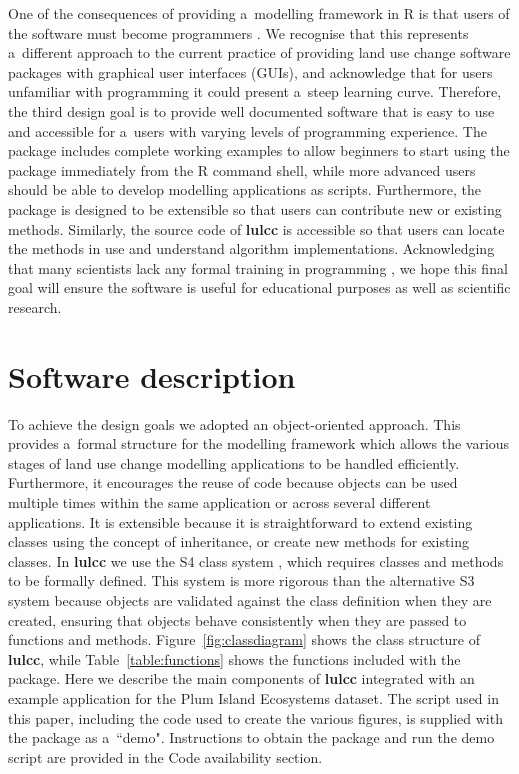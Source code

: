 \documentclass[gmdd, online, hvmath]{copernicus}
\begin{document}
One of the consequences of providing a~modelling framework in R is that users of the software must become programmers \citep{chambers2000}. We recognise that this represents a~different approach to the current practice of providing land use change software packages with graphical user interfaces (GUIs), and acknowledge that for users unfamiliar with programming it could present a~steep learning curve. Therefore, the third design goal is to provide well documented software that is easy to use and accessible for a~users with varying levels of programming experience. The package includes complete working examples to allow beginners to start using the package immediately from the R command shell, while more advanced users should be able to develop modelling applications as scripts. Furthermore, the package is designed to be extensible so that users can contribute new or existing methods. Similarly, the source code of \textbf{lulcc} is accessible so that users can locate the methods in use and understand algorithm implementations. Acknowledging that many scientists lack any formal training in programming \citep{joppa2013,wilson2014}, we hope this final goal will ensure the software is useful for educational purposes as well as scientific research. \\

\section{Software description}

To achieve the design goals we adopted an object-oriented approach. This provides a~formal structure for the modelling framework which allows the various stages of land use change modelling applications to be handled efficiently. Furthermore, it encourages the reuse of code because objects can be used multiple times within the same application or across several different applications. It is extensible because it is straightforward to extend existing classes using the concept of inheritance, or create new methods for existing classes. In \textbf{lulcc} we use the S4 class system \citep{chambers1998,chambers2008}, which requires classes and methods to be formally defined. This system is more rigorous than the alternative S3 system because objects are validated against the class definition when they are created, ensuring that objects behave consistently when they are passed to functions and methods. Figure~\ref{fig:classdiagram} shows the class structure of \textbf{lulcc}, while Table~\ref{table:functions} shows the functions included with the package. Here we describe the main components of \textbf{lulcc} integrated with an example application for the Plum Island Ecosystems dataset. The script used in this paper, including the code used to create the various figures, is supplied with the package as a~``demo". Instructions to obtain the package and run the demo script are provided in the Code availability section. \\
\end{document}
